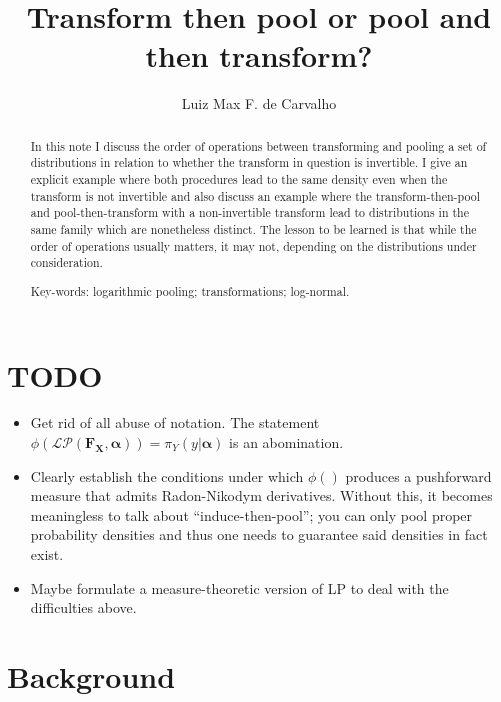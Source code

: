 \documentclass[a4paper, notitlepage, 10pt]{article}
\title{\vspace{-9ex}\centering \bf Transform then pool or pool and then transform?}
\author{
Luiz Max F. de Carvalho\\
}
\begin{document}
\maketitle

\begin{abstract}
In this note I discuss the order of operations between transforming and pooling a set of distributions in relation to whether the transform in question is invertible.
I give an explicit example where both procedures lead to the same density even when the transform is not invertible and also discuss an example where the transform-then-pool and pool-then-transform with a non-invertible transform lead to distributions in the same family which are nonetheless distinct.
The lesson to be learned is that while the order of operations usually matters, it may not, depending on the distributions under consideration.

Key-words: logarithmic pooling; transformations; log-normal. 
\end{abstract}

\section*{TODO}
\begin{itemize}
 \item Get rid of all abuse of notation. 
 The statement $ \phi(\mathcal{LP}(\mathbf{F_X}, \boldsymbol\alpha)) = \pi_{Y}(y | \boldsymbol\alpha)$ is an abomination.
 \item Clearly establish the conditions under which $\phi()$ produces a pushforward measure that admits Radon-Nikodym derivatives. 
 Without this, it becomes meaningless to talk about ``induce-then-pool''; you can only pool proper probability densities and thus one needs to guarantee said densities in fact exist.
 \item Maybe formulate a measure-theoretic version of LP to deal with the difficulties above.
\end{itemize}


\section*{Background}
\end{document}
